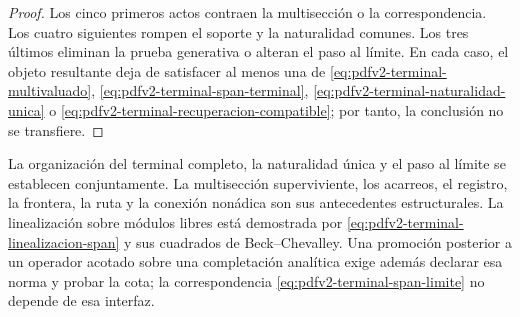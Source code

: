 \begin{proof}
Los cinco primeros actos contraen la multisecci\'on o la correspondencia. Los
cuatro siguientes rompen el soporte y la naturalidad comunes. Los tres
\'ultimos eliminan la prueba generativa o alteran el paso al l\'imite. En
cada caso, el objeto resultante deja de satisfacer al menos una de
\eqref{eq:pdfv2-terminal-multivaluado},
\eqref{eq:pdfv2-terminal-span-terminal},
\eqref{eq:pdfv2-terminal-naturalidad-unica} o
\eqref{eq:pdfv2-terminal-recuperacion-compatible}; por tanto, la conclusi\'on
no se transfiere.
\end{proof}

\begin{statusbox}
La organización del terminal completo, la naturalidad única y el paso al
límite se establecen conjuntamente. La multisección superviviente, los
acarreos, el registro, la frontera, la ruta y la conexión nonádica son sus
antecedentes estructurales.\quad
La linealización sobre módulos libres está demostrada por
\eqref{eq:pdfv2-terminal-linealizacion-span} y sus cuadrados de
Beck--Chevalley. Una promoción posterior a un operador acotado sobre una
completación analítica exige además declarar esa norma y probar la cota; la
correspondencia \eqref{eq:pdfv2-terminal-span-limite} no depende de esa
interfaz.
\end{statusbox}
